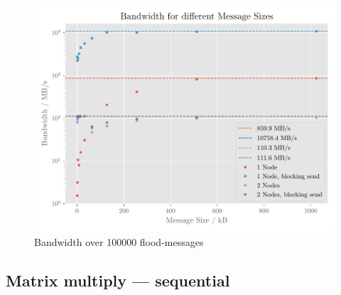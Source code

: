 \documentclass[]{scrartcl}
\begin{document}
\begin{figure}[ht]
    \centering
    \includegraphics[width=\linewidth]{img/bandwidth}
    \caption{Bandwidth over 100000 flood-messages}%
    \label{fig:bandwidth}
\end{figure}
\subsection{Matrix multiply --- sequential}
\end{document}
